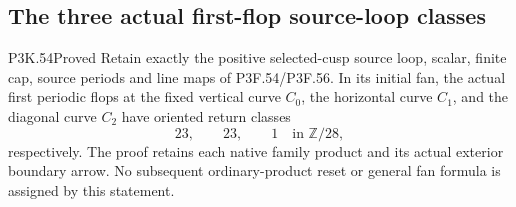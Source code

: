 \subsection{The three actual first-flop source-loop classes}
\begin{statement}{P3K.54}{Proved}
Retain exactly the positive selected-cusp source loop, scalar, finite cap,
source periods and line maps of P3F.54/P3F.56. In its initial fan,
the actual first periodic flops at the fixed vertical curve \(C_0\),
the horizontal curve \(C_1\), and the diagonal curve \(C_2\) have
oriented return classes
\[
 23,\qquad23,\qquad1\quad\text{in }\mathbb Z/28,
\]
respectively. The proof retains each native family product and its
actual exterior boundary arrow. No subsequent ordinary-product
reset or general fan formula is assigned by this statement.
\end{statement}
